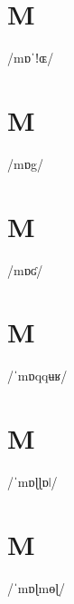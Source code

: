 \documentclass[10pt,a4paper,twoside]{book}
\begin{document}
\section*{M}

\begin{multicols}{3}
 {/mɒˈǃɶ/} {}
\end{multicols}

\section*{M}

\begin{multicols}{3}
 {/mɒg/} {}
\end{multicols}

\section*{M}

\begin{multicols}{3}
 {/mɒʛ/} {}
\end{multicols}

\section*{M}

\begin{multicols}{3}
 {/ˈmɒqqʉʁ/} {}
\end{multicols}

\section*{M}

\begin{multicols}{3}
 {/ˈmɒɭɭɒǀ/} {}
\end{multicols}

\section*{M}

\begin{multicols}{3}
 {/ˈmɒɭmɵɭ/} {}
\end{multicols}
\end{document}
